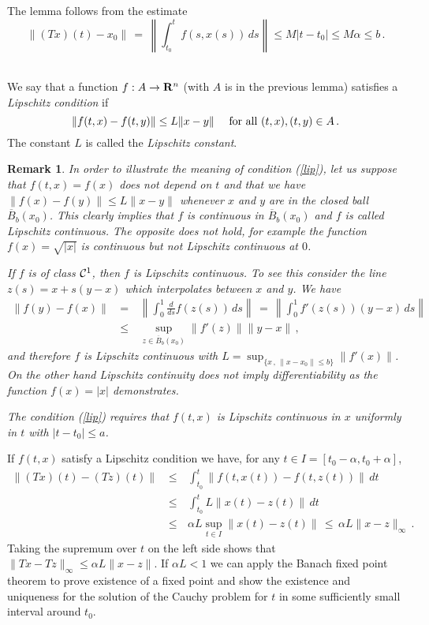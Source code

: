 \documentclass[12pt]{report}
\newcommand{\calC}{{\cal C}}
\newcommand{\bR}{{\bf R}}
\newtheorem{remark}[theorem]{Remark}
\newcommand{\proof}{\noindent {\em Proof:~}}
\newcommand{\nn}{\nonumber}
\def\eqref#1{(\ref{#1})}
\def\qed{\hbox{\hskip 6pt\vrule width6pt height7pt depth1pt
    \hskip1pt}\bigskip}
\def\to{\rightarrow}
\begin{document}
\proof The lemma follows from the estimate
\begin{equation}
\| (Tx)(t) - x_0\| \,=\, \left\| \int_{t_0}^t f(s, x(s))\,ds \right\| \le 
M |t-t_0| \le M \alpha \le b \,.
\end{equation}
\hfill \qed
  
  
We say that a function $f: A \to \bR^n$ (with $A$ is in the previous
lemma) satisfies a {\em Lipschitz condition} if
\begin{equation}\label{lip}
\|f(t,x) - f(t,y) \| \le L \|x-y\| \quad {\rm ~for~all~} (t,x), (t,y) \in A\,. 
\end{equation}
The constant $L$ is called the {\em Lipschitz constant}.  

\begin{remark}{\rm In order to illustrate the meaning of condition 
\eqref{lip}, let us suppose that $f(t,x)= f(x)$ does not depend on $t$
and that we have $\|f(x) -f(y)\| \le L\|x-y\|$ whenever $x$ and $y$
are in the closed ball ${\overline B_b(x_0)}$.  This clearly implies
that $f$ is continuous in ${\overline B_b(x_0)}$ and $f$ is called
{\em Lipschitz continuous}.  The opposite does not hold, for example
the function $f(x) = \sqrt{|x|}$ is continuous but not Lipschitz
continuous at $0$.

If $f$ is of class $\calC^1$, then $f$ is Lipschitz continuous.  To see this 
consider the line $z(s)= x + s(y-x)$ which interpolates between $x$
and $y$. We have
\begin{eqnarray}
\| f(y) - f(x) \| \,&=&\, \left\| \int_0^1 \frac{d}{ds} f(z(s)) \,ds 
\right\| \,=\, 
\left\| \int_0^1  f'(z(s))(y-x) \,ds \right\|  \nn \\
  \,& \le &\, \sup_{z \in {\overline B_b(x_0)}}  \| f'(z) \| \| y-x\|\,,
\end{eqnarray}
and therefore $f$ is Lipschitz continuous with $L = \sup_{\{x\,,\,
\|x-x_0\| \le b \}} \| f'(x)\|$.  On the other hand Lipschitz
continuity does not imply differentiability as the function $f(x)=|x|$
demonstrates. 

The condition \eqref{lip} requires that $f(t,x)$ is Lipschitz
continuous in $x$ uniformly in $t$ with $|t-t_0|\le a$.  }
\end{remark}

If $f(t,x)$ satisfy a Lipschitz condition we have, for any $t \in I =
[t_0 - \alpha, t_0 + \alpha]$,
\begin{eqnarray}\label{uy}
\| (Tx)(t) - (Tz)(t) \| \,&\le & \, \int_{t_0}^t \| f(t, x(t)) - f(t, z(t))\| 
\, dt  \nn \\
\,&\le&  \, \int_{t_0}^t L \| x(t) -  z(t) \| \, dt  \nn \\
\,&\le & \, \alpha L \sup_{t \in I} \|x(t) - z(t)\| \, \le \, \alpha L 
\| x - z \|_\infty \,.
\end{eqnarray} 
Taking the supremum over $t$ on the left side shows that $\|Tx -
Tz\|_\infty \le \alpha L \|x-z\|$. If $\alpha L <1$ we can apply the
Banach fixed point theorem to prove existence of a fixed point and
show the existence and uniqueness for the solution of the Cauchy
problem for $t$ in some sufficiently small interval around $t_0$.
\end{document}

